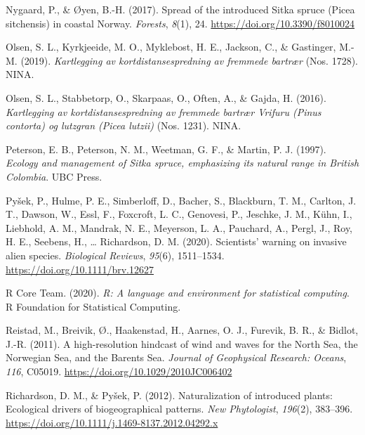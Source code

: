 \documentclass[
]{article}
\begin{document}
\leavevmode\hypertarget{ref-nygaardSpreadIntroducedSitka2017}{}%
Nygaard, P., \& Øyen, B.-H. (2017). Spread of the introduced Sitka spruce (Picea sitchensis) in coastal Norway. \emph{Forests}, \emph{8}(1), 24. \url{https://doi.org/10.3390/f8010024}

\leavevmode\hypertarget{ref-olsenKartleggingAvKortdistansespredning2019}{}%
Olsen, S. L., Kyrkjeeide, M. O., Myklebost, H. E., Jackson, C., \& Gastinger, M.-M. (2019). \emph{Kartlegging av kortdistansespredning av fremmede bartrær} (Nos. 1728). NINA.

\leavevmode\hypertarget{ref-olsenKartleggingAvKortdistansespredning2016}{}%
Olsen, S. L., Stabbetorp, O., Skarpaas, O., Often, A., \& Gajda, H. (2016). \emph{Kartlegging av kortdistansespredning av fremmede bartrær Vrifuru (Pinus contorta) og lutzgran (Picea lutzii)} (Nos. 1231). NINA.

\leavevmode\hypertarget{ref-petersonEcologyManagementSitka1997}{}%
Peterson, E. B., Peterson, N. M., Weetman, G. F., \& Martin, P. J. (1997). \emph{Ecology and management of Sitka spruce, emphasizing its natural range in British Colombia}. UBC Press.

\leavevmode\hypertarget{ref-pysekScientistsWarningInvasive2020}{}%
Pyšek, P., Hulme, P. E., Simberloff, D., Bacher, S., Blackburn, T. M., Carlton, J. T., Dawson, W., Essl, F., Foxcroft, L. C., Genovesi, P., Jeschke, J. M., Kühn, I., Liebhold, A. M., Mandrak, N. E., Meyerson, L. A., Pauchard, A., Pergl, J., Roy, H. E., Seebens, H., \ldots{} Richardson, D. M. (2020). Scientists' warning on invasive alien species. \emph{Biological Reviews}, \emph{95}(6), 1511--1534. \url{https://doi.org/10.1111/brv.12627}

\leavevmode\hypertarget{ref-rcoreteamLanguageEnvironmentStatistical2020}{}%
R Core Team. (2020). \emph{R: A language and environment for statistical computing}. R Foundation for Statistical Computing.

\leavevmode\hypertarget{ref-reistadHighresolutionHindcastWind2011}{}%
Reistad, M., Breivik, Ø., Haakenstad, H., Aarnes, O. J., Furevik, B. R., \& Bidlot, J.-R. (2011). A high-resolution hindcast of wind and waves for the North Sea, the Norwegian Sea, and the Barents Sea. \emph{Journal of Geophysical Research: Oceans}, \emph{116}, C05019. \url{https://doi.org/10.1029/2010JC006402}

\leavevmode\hypertarget{ref-richardsonNaturalizationIntroducedPlants2012}{}%
Richardson, D. M., \& Pyšek, P. (2012). Naturalization of introduced plants: Ecological drivers of biogeographical patterns. \emph{New Phytologist}, \emph{196}(2), 383--396. \url{https://doi.org/10.1111/j.1469-8137.2012.04292.x}
\end{document}
